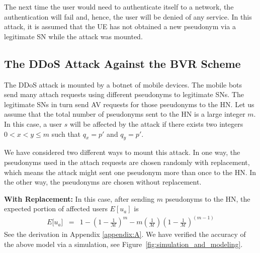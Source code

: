 \documentclass{llncs} %
\begin{document}
The next time the user would need to authenticate itself to a network, the authentication will fail and, hence, the user will be denied of any service. In this attack, it is assumed that the UE has not obtained a new pseudonym via a legitimate SN while the attack was mounted.

\subsection{The DDoS Attack Against the BVR Scheme} \label{sec:ddos_attack}
The DDoS attack is mounted by a botnet of mobile devices. The mobile bots send many attach requests using different pseudonyms to legitimate SNs. The legitimate SNs in turn send AV requests for those pseudonyms to the HN. Let us assume that the total number of pseudonyms sent to the HN is a large integer $m$. In this case, a user $s$ will be affected by the attack if there exists two integers $0 < x < y \leq m$ such that $q_{x} = p'$ and $q_{y} = p'$. 


We have considered two different ways to mount this attack. In one way, the pseudonyms used in the attach requests are chosen randomly with replacement, which means the attack might sent one pseudonym more than once to the HN. In the other way, the pseudonyms are chosen without replacement.

\textbf{With Replacement:} In this case, after sending $m$ pseudonyms to the HN, the expected portion of affected users $E[u_a]$ is
\begin{eqnarray}
E\big[ u_a \big] &=& 1- \left(1 - \frac{1}{\mathcal{M}}\right)^m - m\left(\frac{1}{\mathcal{M}}\right)\left(1 - \frac{1}{\mathcal{M}}\right)^{\left(m-1 \right)} \label{eqn:avg_with_replacement}
\end{eqnarray} 
See the derivation in Appendix \ref{appendix:A}. We have verified the accuracy of the above model via a simulation, see Figure~\ref{fig:simulation_and_modeling}.
\end{document}
